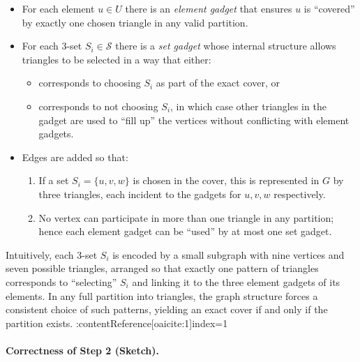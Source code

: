\documentclass[9pt]{extarticle}
\begin{document}
\begin{itemize}
    \item For each element $u \in U$ there is an \emph{element gadget} that
          ensures $u$ is ``covered'' by exactly one chosen triangle in any valid
          partition.
    \item For each 3-set $S_i \in \mathcal{S}$ there is a \emph{set gadget}
          whose internal structure allows triangles to be selected in a way
          that either:
          \begin{itemize}
              \item corresponds to choosing $S_i$ as part of the exact cover, or
              \item corresponds to not choosing $S_i$, in which case other
                    triangles in the gadget are used to ``fill up'' the vertices
                    without conflicting with element gadgets.
          \end{itemize}
    \item Edges are added so that:
          \begin{enumerate}
              \item If a set $S_i = \{u, v, w\}$ is chosen in the cover, this
                    is represented in $G$ by three triangles, each incident to
                    the gadgets for $u, v, w$ respectively.
              \item No vertex can participate in more than one triangle in any
                    partition; hence each element gadget can be ``used'' by at
                    most one set gadget.
          \end{enumerate}
\end{itemize}

Intuitively, each 3-set $S_i$ is encoded by a small subgraph with nine
vertices and seven possible triangles, arranged so that exactly one pattern
of triangles corresponds to ``selecting'' $S_i$ and linking it to the three
element gadgets of its elements.  In any full partition into triangles, the
graph structure forces a consistent choice of such patterns, yielding an exact
cover if and only if the partition exists. :contentReference[oaicite:1]{index=1}

\paragraph{Correctness of Step 2 (Sketch).}
\end{document}
